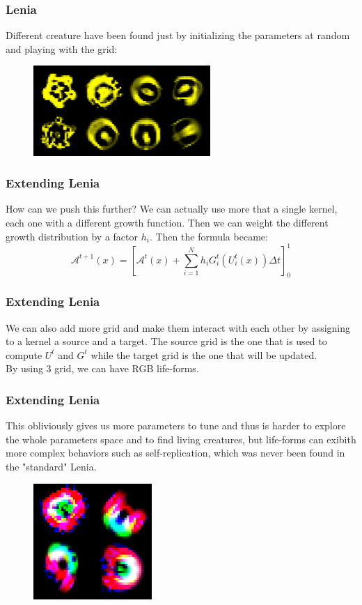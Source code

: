 \documentclass{beamer}
\begin{document}
\begin{frame}
  \frametitle{Lenia}
  Different creature have been found just by initializing the parameters at random and playing with the grid:
  \begin{figure}
    \begin{center}
      \includegraphics[width=0.6\textwidth]{./creatures.jpg}
    \end{center}
  \end{figure}
\end{frame}

\begin{frame}
  \frametitle{Extending Lenia}
  How can we push this further? We can actually use more that a single kernel,
  each one with a different growth function. Then we can weight the different
  growth distribution by a factor $h_i$. Then the formula became:
  \begin{equation}
    \mathcal{A}^{t+1}(x) = [\mathcal{A}^t(x) + \sum_{i=1}^N h_i G^t_i(U^t_i(x))\Delta t]^1_0
  \end{equation}
\end{frame}

\begin{frame}
  \frametitle{Extending Lenia}
  We can also add more grid and make them interact with each other by assigning
  to a kernel a source and a target. The source grid is the one that is used to
  compute $U^t$ and $G^t$ while the target grid is the one that will be updated.\\
  By using 3 grid, we can have RGB life-forms.
\end{frame}

\begin{frame}
  \frametitle{Extending Lenia}
  This obliviously gives us more parameters to tune and thus is harder to
  explore the whole parameters space and to find living creatures, but life-forms can
  exibith more complex behaviors such as self-replication, which was never been
  found in the "standard" Lenia.
  \begin{figure}
    \begin{center}
      \includegraphics[width=0.4\textwidth]{./creatures_rgb.jpg}
    \end{center}
  \end{figure}
\end{frame}
\end{document}
